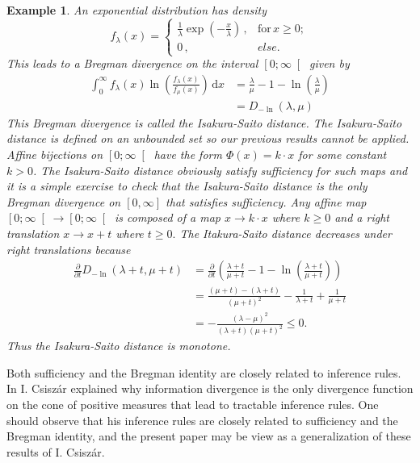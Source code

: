 \documentclass[10pt,a4paper,draft]{article}
\newtheorem{Example}{Example}
\begin{document}
\begin{Example}
An exponential distribution has density
\[
f_{\lambda}\left(x\right)=\begin{cases}
\frac{1}{\lambda}\exp\left(-\frac{x}{\lambda}\right)\,, &
\mathrm{for}\,x\geq0;\\
0\,, & else.
\end{cases}
\]
This leads to a Bregman divergence on the interval
$\left[0;\infty\right[$
given by
\begin{align*}
\int_{0}^{\infty}f_{\lambda}\left(x\right)\ln\left(\frac{f_{\lambda}\left(x\right)}{f_{\mu}\left(x\right)}\right)\,\mathrm{d}x
&
=\frac{\lambda}{\mu}-1-\ln\left(\frac{\lambda}{\mu}\right)\\
 & =D_{-\ln}\left(\lambda,\mu\right)
\end{align*}
This Bregman divergence is called the \emph{Isakura-Saito
distance}. The Isakura-Saito distance is defined on an unbounded set so our
previous results cannot be applied. Affine bijections on
$\left[0;\infty\right[$ have the form $\Phi\left(x\right)=k\cdot x$ for some constant
$k>0$.
The Isakura-Saito distance obviously satisfy sufficiency for
such maps and it is a simple exercise to check that the Isakura-Saito distance is
the only Bregman divergence on $[0,\infty ]$ that satisfies sufficiency. Any affine map
$\left[0;\infty\right[\to\left[0;\infty\right[$ is composed of a map $x\to k\cdot x$ where $k\geq0$ and a right
translation $x\to x+t$ where $t\geq0.$ The Itakura-Saito distance decreases
under right translations because
\begin{align*}
\frac{\partial}{\partial t}D_{-\ln}\left(\lambda+t,\mu+t\right)
& =\frac{\partial}{\partial
t}\left(\frac{\lambda+t}{\mu+t}-1-\ln\left(\frac{\lambda+t}{\mu+t}\right)\right)\\
&
=\frac{\left(\mu+t\right)-\left(\lambda+t\right)}{\left(\mu+t\right)^{2}}-\frac{1}{\lambda+t}+\frac{1}{\mu+t}\\
&
=-\frac{\left(\lambda-\mu\right)^{2}}{\left(\lambda+t\right)\left(\mu+t\right)^{2}}\leq0.
\end{align*}
Thus the Isakura-Saito distance is monotone.
\end{Example}

Both sufficiency and the Bregman identity are closely related to inference rules. In \cite{Csiszar1991} I. Csisz{\'a}r explained why information divergence is the only divergence function on the cone of positive measures that lead to tractable inference rules. One should observe that his inference rules are closely related to sufficiency and the Bregman identity, and the present paper may be view as a generalization of these results of I. Csisz{\'a}r.
\end{document}
